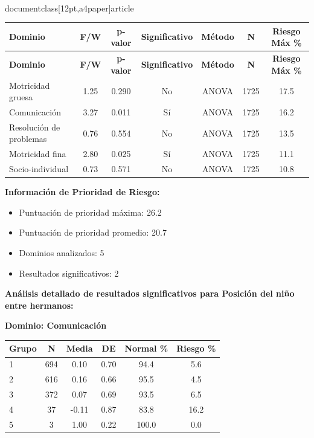\\documentclass[12pt,a4paper]{article}
\begin{document}
\begin{longtable}{|l|c|c|c|c|c|c|}
\hline
\textbf{Dominio} & \textbf{F/W} & \textbf{p-valor} & \textbf{Significativo} & \textbf{Método} & \textbf{N} & \textbf{Riesgo Máx \%} \\
\hline
\endfirsthead

\hline
\textbf{Dominio} & \textbf{F/W} & \textbf{p-valor} & \textbf{Significativo} & \textbf{Método} & \textbf{N} & \textbf{Riesgo Máx \%} \\
\hline
\endhead

\hline
\endfoot

\hline
\endlastfoot

Motricidad gruesa & 1.25 & 0.290 & No & ANOVA & 1725 & 17.5 \\
Comunicación & 3.27 & 0.011 & Sí & ANOVA & 1725 & 16.2 \\
Resolución de problemas & 0.76 & 0.554 & No & ANOVA & 1725 & 13.5 \\
Motricidad fina & 2.80 & 0.025 & Sí & ANOVA & 1725 & 11.1 \\
Socio-individual & 0.73 & 0.571 & No & ANOVA & 1725 & 10.8 \\

\end{longtable}


\textbf{Información de Prioridad de Riesgo:}
\begin{itemize}
\item Puntuación de prioridad máxima: 26.2
\item Puntuación de prioridad promedio: 20.7
\item Dominios analizados: 5
\item Resultados significativos: 2
\end{itemize}


\textbf{Análisis detallado de resultados significativos para Posición del niño entre hermanos:}


\textbf{Dominio: Comunicación}


\begin{center}
\begin{tabular}{|l|c|c|c|c|c|}
\hline
\textbf{Grupo} & \textbf{N} & \textbf{Media} & \textbf{DE} & \textbf{Normal \%} & \textbf{Riesgo \%} \\
\hline
1 & 694 & 0.10 & 0.70 & 94.4 & 5.6 \\
2 & 616 & 0.16 & 0.66 & 95.5 & 4.5 \\
3 & 372 & 0.07 & 0.69 & 93.5 & 6.5 \\
4 & 37 & -0.11 & 0.87 & 83.8 & 16.2 \\
5 & 3 & 1.00 & 0.22 & 100.0 & 0.0 \\

\hline
\end{tabular}
\end{center}
\end{document}
